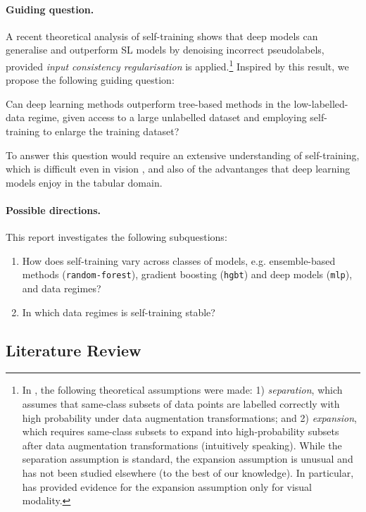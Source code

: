 \documentclass{article}
\begin{document}
\paragraph{Guiding question.}
A recent theoretical analysis of self-training \cite{wei2022theoretical} shows that deep
models can generalise and outperform SL models by denoising incorrect pseudolabels,
provided \emph{input consistency regularisation} is applied.\footnote{%
  In \cite{wei2022theoretical}, the following theoretical assumptions were made: 1)
  \emph{separation}, which assumes that same-class subsets of data points are labelled
  correctly with high probability under data augmentation transformations; and 2)
  \emph{expansion}, which requires same-class subsets to expand into high-probability
  subsets after data augmentation transformations (intuitively speaking).
  While the separation assumption is standard, the expansion assumption is unusual and
  has not been studied elsewhere (to the best of our knowledge).
  In particular, \cite{wei2022theoretical} has provided evidence for the expansion
  assumption only for visual modality.
} Inspired by this result, we propose the following guiding question:
\begin{displayquote}
  Can deep learning methods outperform tree-based methods in the low-labelled-data
  regime, given access to a large unlabelled dataset and employing self-training to
  enlarge the training dataset?
\end{displayquote}
To answer this question would require an extensive understanding of self-training, which
is difficult even in vision \cite{wei2022theoretical}, and also of the advantanges that
deep learning models enjoy in the tabular domain.

\paragraph{Possible directions.}
This report investigates the following subquestions:
\begin{enumerate}
  \item How does self-training vary across classes of models, e.g. ensemble-based
  methods (\texttt{random-forest}), gradient boosting (\texttt{hgbt}) and deep models
  (\texttt{mlp}), and data regimes?
  \item In which data regimes is self-training stable?
\end{enumerate}

\subsection{Literature Review}
\end{document}
